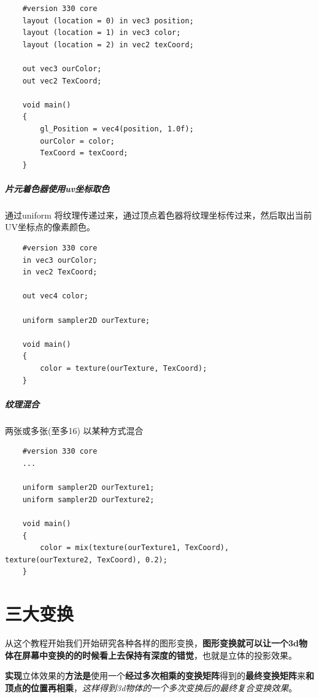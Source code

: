 \documentclass[UTF8,a4paper,12pt]{ctexbook}
\begin{document}
				\begin{lstlisting}
	#version 330 core
	layout (location = 0) in vec3 position;
	layout (location = 1) in vec3 color;
	layout (location = 2) in vec2 texCoord;
	
	out vec3 ourColor;
	out vec2 TexCoord;
	
	void main()
	{
	    gl_Position = vec4(position, 1.0f);
	    ourColor = color;
	    TexCoord = texCoord;
	}				
				\end{lstlisting}
				
			
			\paragraph{片元着色器使用uv坐标取色}
				
				通过uniform 将纹理传递过来，通过顶点着色器将纹理坐标传过来，然后取出当前UV坐标点的像素颜色。
			
				\begin{lstlisting}
	#version 330 core
	in vec3 ourColor;
	in vec2 TexCoord;
	
	out vec4 color;
	
	uniform sampler2D ourTexture;
	
	void main()
	{
	    color = texture(ourTexture, TexCoord);
	}				
				\end{lstlisting}
			
			
			\paragraph{纹理混合}
				两张或多张(至多16) 以某种方式混合
				
				\begin{lstlisting}
	#version 330 core
	...
	
	uniform sampler2D ourTexture1;
	uniform sampler2D ourTexture2;
	
	void main()
	{
	    color = mix(texture(ourTexture1, TexCoord), texture(ourTexture2, TexCoord), 0.2);
	}				
				\end{lstlisting}


\chapter{三大变换}
	从这个教程开始我们开始研究各种各样的图形变换，\textbf{图形变换就可以让一个3d物体在屏幕中变换的的时候看上去保持有深度的错觉}，也就是立体的投影效果。
	
	\textbf{实现}立体效果的\textbf{方法是}使用一个\textbf{经过多次相乘的变换矩阵}得到的\textbf{最终变换矩阵}来\textbf{和顶点的位置再相乘}，\textit{这样得到3d物体的一个多次变换后的最终复合变换效果}。
	
\end{document}
